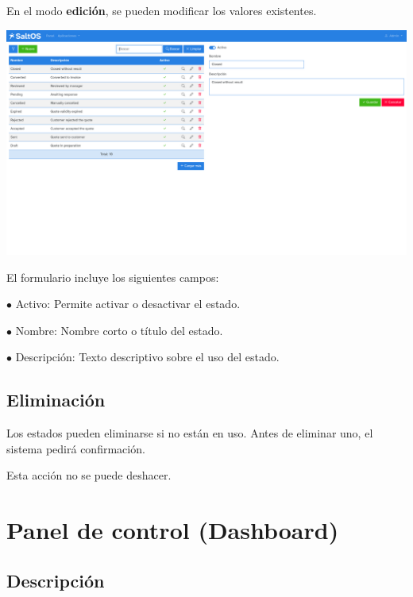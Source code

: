 \documentclass[a4paper]{article}
\begin{document}
En el modo \textbf{edición}, se pueden modificar los valores existentes.

\begin{center}\includegraphics[width=1\textwidth]{../ujest/snaps/test-screenshots-js-screenshots-crm-quotes-status-edit-10-es-es-1-snap.png}\end{center}

El formulario incluye los siguientes campos:

\begin{compactitem}
\item[\color{myblue}$\bullet$] Activo: Permite activar o desactivar el estado.
\item[\color{myblue}$\bullet$] Nombre: Nombre corto o título del estado.
\item[\color{myblue}$\bullet$] Descripción: Texto descriptivo sobre el uso del estado.
\end{compactitem}

\hypertarget{toc80}{}
\subsection{Eliminación}

Los estados pueden eliminarse si no están en uso.
Antes de eliminar uno, el sistema pedirá confirmación.

Esta acción no se puede deshacer.


\hypertarget{toc81}{}
\section{Panel de control (Dashboard)}

\hypertarget{toc82}{}
\subsection{Descripción}
\end{document}
